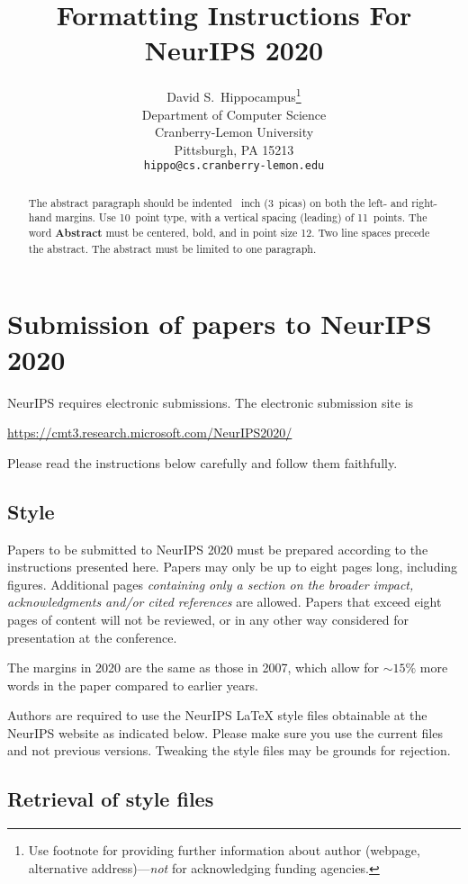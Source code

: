 \documentclass{article}
\title{Formatting Instructions For NeurIPS 2020}
\author{%
  David S.~Hippocampus\thanks{Use footnote for providing further information
    about author (webpage, alternative address)---\emph{not} for acknowledging
    funding agencies.} \\
  Department of Computer Science\\
  Cranberry-Lemon University\\
  Pittsburgh, PA 15213 \\
  \texttt{hippo@cs.cranberry-lemon.edu} \\
}
\begin{document}
\maketitle

\begin{abstract}
  The abstract paragraph should be indented ~inch (3~picas) on
  both the left- and right-hand margins. Use 10~point type, with a vertical
  spacing (leading) of 11~points.  The word \textbf{Abstract} must be centered,
  bold, and in point size 12. Two line spaces precede the abstract. The abstract
  must be limited to one paragraph.
\end{abstract}

\section{Submission of papers to NeurIPS 2020}

NeurIPS requires electronic submissions.  The electronic submission site is
\begin{center}
  \url{https://cmt3.research.microsoft.com/NeurIPS2020/}
\end{center}

Please read the instructions below carefully and follow them faithfully.

\subsection{Style}

Papers to be submitted to NeurIPS 2020 must be prepared according to the
instructions presented here. Papers may only be up to eight pages long,
including figures. Additional pages \emph{containing only a section on the broader impact, acknowledgments and/or cited references} are allowed. Papers that exceed eight pages of content will not be reviewed, or in any other way considered for
presentation at the conference.

The margins in 2020 are the same as those in 2007, which allow for $\sim$$15\%$
more words in the paper compared to earlier years.

Authors are required to use the NeurIPS \LaTeX{} style files obtainable at the
NeurIPS website as indicated below. Please make sure you use the current files
and not previous versions. Tweaking the style files may be grounds for
rejection.

\subsection{Retrieval of style files}
\end{document}
